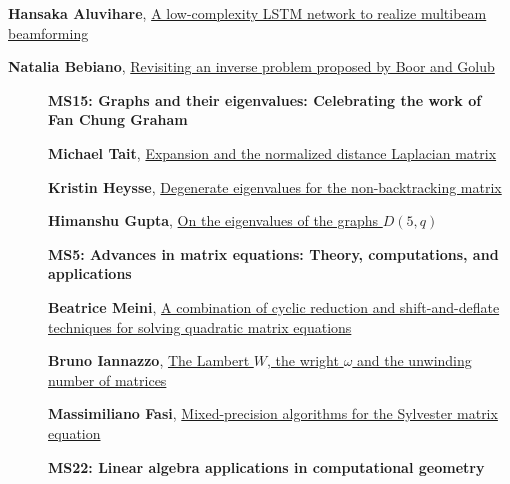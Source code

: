 \documentclass[ILAS2025-program.tex]{subfiles}
\begin{document}
\begin{description}
\begin{description}
{}
        \item[\info{14:30\textrm{--}15:00}] \hypertarget{up0059}{}\textbf{Hansaka Aluvihare}, \hyperlink{down0059}{A low-complexity LSTM network to realize multibeam beamforming
}
        \item[\info{15:00\textrm{--}15:30}] \hypertarget{up0060}{}\textbf{Natalia Bebiano}, \hyperlink{down0060}{Revisiting an inverse problem proposed by Boor and Golub
}
        \end{description}
    \begin{description}
    \item[] {\color{mstitle}\textbf{MS15: Graphs and their eigenvalues: Celebrating the work of Fan Chung Graham}} 
    \item[] \hypertarget{up0061}{}\textbf{Michael Tait}, \hyperlink{down0061}{Expansion and the normalized distance Laplacian matrix}
        \item[] \hypertarget{up0062}{}\textbf{Kristin Heysse}, \hyperlink{down0062}{Degenerate eigenvalues for the non-backtracking matrix}
        \item[] \hypertarget{up0063}{}\textbf{Himanshu Gupta}, \hyperlink{down0063}{On the eigenvalues of the graphs $D(5, q)$}
        \end{description}
    \begin{description}
    \item[] {\color{mstitle}\textbf{MS5: Advances in matrix equations: Theory, computations, and applications}} 
    \item[] \hypertarget{up0064}{}\textbf{Beatrice Meini}, \hyperlink{down0064}{A combination of cyclic reduction and shift-and-deflate techniques for solving quadratic matrix equations
}
        \item[] \hypertarget{up0065}{}\textbf{Bruno Iannazzo}, \hyperlink{down0065}{The Lambert $W$, the wright $\omega$ and the unwinding number of matrices
}
        \item[] \hypertarget{up0066}{}\textbf{Massimiliano Fasi}, \hyperlink{down0066}{Mixed-precision algorithms for the Sylvester matrix equation}
        \end{description}
    \begin{description}
    \item[] {\color{mstitle}\textbf{MS22: Linear algebra applications in computational geometry}} 

\end{description}
\end{description}
\end{document}
